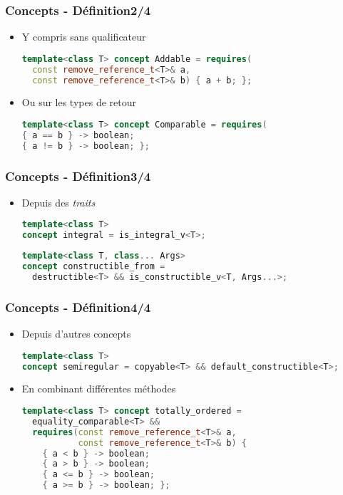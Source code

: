 \documentclass[C++.tex]{subfiles}
\begin{document}
\begin{frame}[fragile]
	\frametitle{Concepts - Définition\titlehfill{}2/4}
	\begin{itemize}
		\item Y compris sans qualificateur

		\begin{lstlisting}[language=C++]
template<class T> concept Addable = requires(
  const remove_reference_t<T>& a,
  const remove_reference_t<T>& b) { a + b; };\end{lstlisting}

		\item Ou sur les types de retour

		\begin{lstlisting}[language=C++]
template<class T> concept Comparable = requires(
{ a == b } -> boolean;
{ a != b } -> boolean; };\end{lstlisting}
	\end{itemize}
\end{frame}

\begin{frame}[fragile]
	\frametitle{Concepts - Définition\titlehfill{}3/4}
	\begin{itemize}
		\item Depuis des \textit{traits}

		\begin{lstlisting}[language=C++]
template<class T>
concept integral = is_integral_v<T>;\end{lstlisting}

		\begin{lstlisting}[language=C++]
template<class T, class... Args>
concept constructible_from = 
  destructible<T> && is_constructible_v<T, Args...>;\end{lstlisting}
	\end{itemize}
\end{frame}

\begin{frame}[fragile]
	\frametitle{Concepts - Définition\titlehfill{}4/4}
	\begin{itemize}
		\item Depuis d'autres concepts

		\begin{lstlisting}[language=C++]
template<class T>
concept semiregular = copyable<T> && default_constructible<T>;\end{lstlisting}

		\item En combinant différentes méthodes

		\begin{lstlisting}[language=C++]
template<class T> concept totally_ordered =
  equality_comparable<T> &&
  requires(const remove_reference_t<T>& a,
           const remove_reference_t<T>& b) {
    { a < b } -> boolean;
    { a > b } -> boolean;
    { a <= b } -> boolean;
    { a >= b } -> boolean; };\end{lstlisting}
	\end{itemize}
\end{frame}
\end{document}
